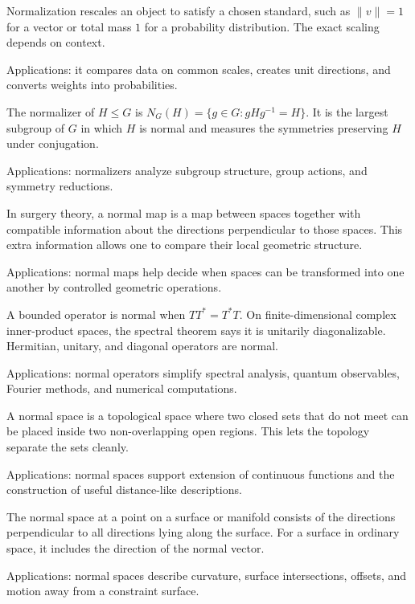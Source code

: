 Normalization rescales an object to satisfy a chosen standard, such as $\|v\|=1$ for a vector or total mass $1$ for a probability distribution. The exact scaling depends on context. \par\noindent Applications: it compares data on common scales, creates unit directions, and converts weights into probabilities.

The normalizer of $H\leq G$ is $N_G(H)=\{g\in G:gHg^{-1}=H\}$. It is the largest subgroup of $G$ in which $H$ is normal and measures the symmetries preserving $H$ under conjugation. \par\noindent Applications: normalizers analyze subgroup structure, group actions, and symmetry reductions.

In surgery theory, a normal map is a map between spaces together with compatible information about the directions perpendicular to those spaces. This extra information allows one to compare their local geometric structure. \par\noindent Applications: normal maps help decide when spaces can be transformed into one another by controlled geometric operations.

A bounded operator is normal when $TT^*=T^*T$. On finite-dimensional complex inner-product spaces, the spectral theorem says it is unitarily diagonalizable. Hermitian, unitary, and diagonal operators are normal. \par\noindent Applications: normal operators simplify spectral analysis, quantum observables, Fourier methods, and numerical computations.

A normal space is a topological space where two closed sets that do not meet can be placed inside two non-overlapping open regions. This lets the topology separate the sets cleanly. \par\noindent Applications: normal spaces support extension of continuous functions and the construction of useful distance-like descriptions.

The normal space at a point on a surface or manifold consists of the directions perpendicular to all directions lying along the surface. For a surface in ordinary space, it includes the direction of the normal vector. \par\noindent Applications: normal spaces describe curvature, surface intersections, offsets, and motion away from a constraint surface.

